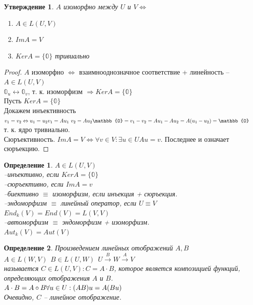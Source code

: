 \documentclass[12pt]{article}
\newtheorem{defin}{Определение}
\newtheorem*{stat}{Утверждение}
\newenvironment{mylist}{\begin{enumerate}[noitemsep, nolistsep]}{\end{enumerate}}
\theoremstyle{remark}
\theoremstyle{definition}
\newcommand{\0}{\mathbb{0}}
\begin{document}
	\begin{stat}
		$A$ изоморфно между $U$ и $V \Leftrightarrow$ 
		\begin{mylist}
			\item $A \in L(U, V)$
			\item $ImA = V$
			\item $KerA = \{\0\}$ тривиально 
		\end{mylist}
	\end{stat}
	\begin{proof}
		$A$ изоморфно $\Leftrightarrow$ взаимнооднозначное соответствие + линейность -- $A\in L(U, V)$\\
		$\0_u \leftrightarrow \0_v$, т. к. изоморфизм $\Rightarrow KerA = \{\0\}$\\
		Пусть $KerA = \{\0\}$\\
		Докажем инъективность $v_1 = v_2 \Leftrightarrow u_1 = u_2\\
		v_1 = Au_1 \ v_2 = Au_2\\
		\0 = v_1-v_2 = Au_1 - Au_2 = A(u_1 - u_2) = \0$ т. к. ядро тривиально.\\
		Сюръективность. $ImA = V \Leftrightarrow \forall v \in V: \exists u \in U Au = v$. Последнее и означает сюръекцию.
	\end{proof}
	\begin{defin}
		$A \in L(U, V)$\\
		--инъективно, если $KerA = \{\0 \}$\\
		--сюръективно, если $Im A = v$\\
		--биективно $\equiv$ изоморфизм, если инъекция + сюръекция.\\
		--эндоморфизм $\equiv$ линейный оператор, если $U \equiv V$\\
		$End_k(V) = End(V) = L(V, V)$\\
		--автоморфизм $\equiv$ эндоморфизм + изоморфизм. \\
		$Aut_k(V) = Aut(V)$
	\end{defin}
	\begin{defin}
		Произведением линейных отображений $A, B$ \\
		$A \in L(W, V) \ \  B \in L(U, W) \ \
		U \xrightarrow{B} W \xrightarrow{A} V$\\
		называется $C \in L(U, V) : C = A\cdot B$, которое является композицией функций, определяющих отображения $A$ и $B$.\\
		$A\cdot B = A \circ B\\
		\forall u \in U: (AB)u = A(Bu)$\\
		Очевидно, $C$ -- линейное отображение.
	\end{defin}
\end{document}
